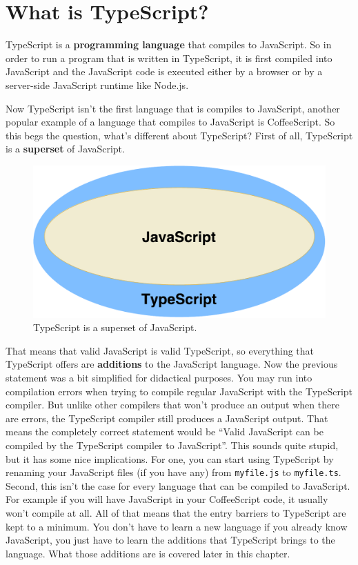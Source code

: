 \documentclass[12pt,a4paper]{report}
\begin{document}
\section{What is TypeScript?}

TypeScript is a \textbf{programming language} that compiles to JavaScript. So in order to run a program that is written in TypeScript, it is first compiled into JavaScript and the JavaScript code is executed either by a browser or by a server-side JavaScript runtime like Node.js.

Now TypeScript isn't the first language that is compiles to JavaScript, another popular example of a language that compiles to JavaScript is CoffeeScript. So this begs the question, what's different about TypeScript? First of all, TypeScript is a \textbf{superset} of JavaScript.
\begin{figure}
\centering
\includegraphics[scale=0.5]{figures/ts-js-diagram.pdf}
\caption{TypeScript is a superset of JavaScript.}
\end{figure}
That means that valid JavaScript is valid TypeScript, so everything that TypeScript offers are \textbf{additions} to the JavaScript language. Now the previous statement was a bit simplified for didactical purposes. You may run into compilation errors when trying to compile regular JavaScript with the TypeScript compiler. But unlike other compilers that won't produce an output when there are errors, the TypeScript compiler still produces a JavaScript output. That means the completely correct statement would be ``Valid JavaScript can be compiled by the TypeScript compiler to JavaScript''. This sounds quite stupid, but it has some nice implications. For one, you can start using TypeScript by renaming your JavaScript files (if you have any) from \texttt{myfile.js} to \texttt{myfile.ts}. Second, this isn't the case for every language that can be compiled to JavaScript. For example if you will have JavaScript in your CoffeeScript code, it usually won't compile at all. All of that means that the entry barriers to TypeScript are kept to a minimum. You don't have to learn a new language if you already know JavaScript, you just have to learn the additions that TypeScript brings to the language. What those additions are  is covered later in this chapter.
\end{document}

